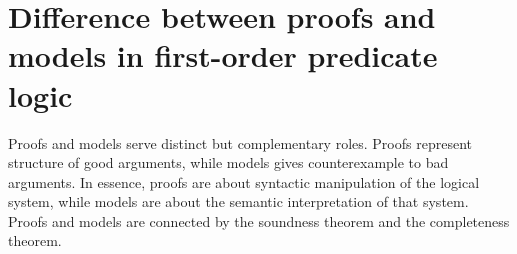\section*{Difference between proofs and models in first-order predicate logic}

Proofs and models serve distinct but complementary roles. Proofs represent structure of good arguments, while models gives counterexample to bad arguments. In essence, proofs are about syntactic manipulation of the logical system, while models are about the semantic interpretation of that system. Proofs and models are connected by the soundness theorem and the completeness theorem.
